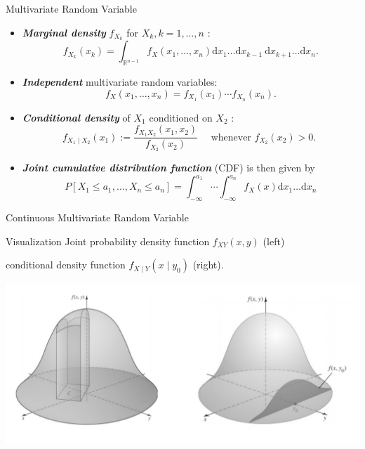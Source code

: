 \documentclass{beamer}
\newcommand{\bb}[1]{\textcolor{antiquefuchsia}{\textbf{\textit{#1}}}}
\begin{document}
\begin{frame}{Multivariate Random Variable}
\begin{itemize}
\item \bb{Marginal density} $f_{X_{k}}$ for $X_{k}, k=1, \ldots, n$ :
$$
f_{X_{k}}\left(x_{k}\right)=\int_{\mathbb{R}^{n-1}} f_{X}\left(x_{1}, \ldots, x_{n}\right) \mathrm{d} x_{1} \ldots \mathrm{d} x_{k-1} \mathrm{~d} x_{k+1} \ldots \mathrm{d} x_{n} .
$$
\item \bb{Independent} multivariate random variables:
$$
f_{X}\left(x_{1}, \ldots, x_{n}\right)=f_{X_{1}}\left(x_{1}\right) \cdots f_{X_{n}}\left(x_{n}\right) .
$$
\item \bb{Conditional density} of $X_{1}$ conditioned on $X_{2}$ :
$$
f_{X_{1} \mid X_{2}}\left(x_{1}\right):=\frac{f_{X_{1} X_{2}}\left(x_{1}, x_{2}\right)}{f_{X_{2}}\left(x_{2}\right)} \quad \text { whenever } f_{X_{2}}\left(x_{2}\right)>0 \text {. }
$$
\item \bb{Joint cumulative distribution function} (CDF) is then given by
$$
P\left[X_{1} \leq a_{1}, \ldots, X_{n} \leq a_{n}\right]=\int_{-\infty}^{a_{1}} \cdots \int_{-\infty}^{a_{n}} f_{X}(x) \mathrm{d} x_{1} \ldots \mathrm{d} x_{n}
$$
\end{itemize}
\end{frame}



\begin{frame}{Continuous Multivariate Random Variable}
\begin{block}{Visualization}
Joint probability density function $f_{X Y}(x, y)$ (left)

conditional density function $f_{X \mid Y}\left(x \mid y_{0}\right)$ (right).
\begin{center}
\includegraphics[scale=0.4]{vis.png}
\end{center}
\end{block}
\end{frame}
\end{document}
